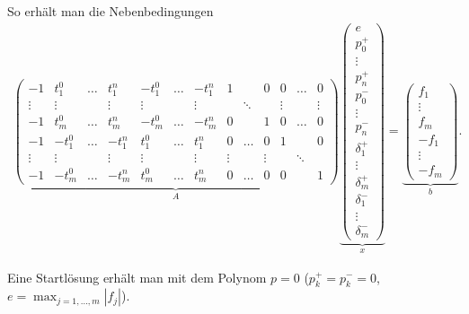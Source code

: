So erhält man die Nebenbedingungen
\begin{align*}
    \underbrace{\left(\begin{array}{ccccccccccccc}
        -1 & t_1^0 & \dots & t_1^n & -t_1^0 & \dots & -t_1^n &
        1 & & 0 & 0 & \dots & 0 \\
        \vdots & \vdots & & \vdots & \vdots & & \vdots & & \ddots &
        & \vdots & & \vdots \\
        -1 & t_m^0 & \dots & t_m^n & -t_m^0 & \dots & -t_m^n &
        0 & & 1 & 0 & \dots & 0 \\
        -1 & -t_1^0 & \dots & -t_1^n & t_1^0 & \dots & t_1^n &
        0 & \dots & 0 & 1 & & 0 \\
        \vdots & \vdots & & \vdots & \vdots & & \vdots &
        \vdots & & \vdots & & \ddots & \\
        -1 & -t_m^0 & \dots & -t_m^n & t_m^0 & \dots & t_m^n &
        0 & \dots & 0 & 0 & & 1
    \end{array}\right)}_{A}
    \underbrace{\left(\begin{array}{c}
        e \\
        p_0^+ \\
        \vdots \\
        p_n^+ \\
        p_0^- \\
        \vdots \\
        p_n^- \\
        \delta_1^+ \\
        \vdots \\
        \delta_m^+ \\
        \delta_1^- \\
        \vdots \\
        \delta_m^-
    \end{array}\right)}_{x}
    =
    \underbrace{\left(\begin{array}{c}
        f_1 \\
        \vdots \\
        f_m \\
        - f_1 \\
        \vdots \\
        - f_m
    \end{array}\right)}_{b}.
\end{align*}

Eine Startlösung erhält man mit dem Polynom $p = 0$
($p_k^+ = p_k^- = 0$, $e = \max_{j=1,\dotsc,m} |f_j|$).

\pagebreak
